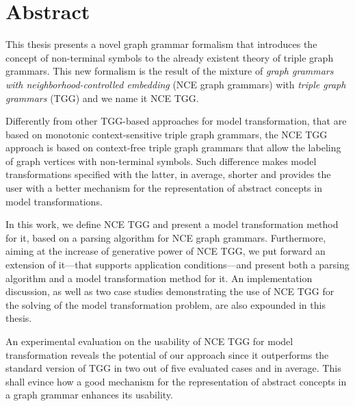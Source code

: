 \chapter*{Abstract}

This thesis presents a novel graph grammar formalism that introduces the concept of non-terminal symbols to the already existent theory of triple graph grammars. This new formalism is the result of the mixture of \emph{graph grammars with neighborhood-controlled embedding} (NCE graph grammars) with \emph{triple graph grammars} (TGG) and we name it NCE TGG.

Differently from other TGG-based approaches for model transformation, that are based on monotonic context-sensitive triple graph grammars, the NCE TGG approach is based on context-free triple graph grammars that allow the labeling of graph vertices with non-terminal symbols. Such difference makes model transformations specified with the latter, in average, shorter and provides the user with a better mechanism for the representation of abstract concepts in model transformations.

In this work, we define NCE TGG and present a model transformation method for it, based on a parsing algorithm for NCE graph grammars. Furthermore, aiming at the increase of generative power of NCE TGG, we put forward an extension of it---that supports application conditions---and present both a parsing algorithm and a model transformation method for it. An implementation discussion, as well as two case studies demonstrating the use of NCE TGG for the solving of the model transformation problem, are also expounded in this thesis.

An experimental evaluation on the usability of NCE TGG for model transformation reveals the potential of our approach since it outperforms the standard version of TGG in two out of five evaluated cases and in average. This shall evince how a good mechanism for the representation of abstract concepts in a graph grammar enhances its usability.